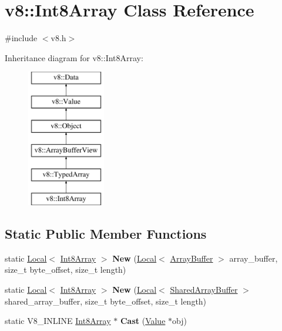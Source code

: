 \hypertarget{classv8_1_1Int8Array}{}\section{v8\+:\+:Int8\+Array Class Reference}
\label{classv8_1_1Int8Array}


{\ttfamily \#include $<$v8.\+h$>$}

Inheritance diagram for v8\+:\+:Int8\+Array\+:\begin{figure}[H]
\begin{center}
\leavevmode
\includegraphics[height=6.000000cm]{classv8_1_1Int8Array}
\end{center}
\end{figure}
\subsection*{Static Public Member Functions}
\begin{DoxyCompactItemize}
\item 
\mbox{\label{classv8_1_1Int8Array_a13e12d1a556aa2ef92271484a10acd21}} 
static \mbox{\hyperlink{classv8_1_1Local}{Local}}$<$ \mbox{\hyperlink{classv8_1_1Int8Array}{Int8\+Array}} $>$ {\bfseries New} (\mbox{\hyperlink{classv8_1_1Local}{Local}}$<$ \mbox{\hyperlink{classv8_1_1ArrayBuffer}{Array\+Buffer}} $>$ array\+\_\+buffer, size\+\_\+t byte\+\_\+offset, size\+\_\+t length)
\item 
\mbox{\label{classv8_1_1Int8Array_a364d52f1dc634e637321b2a9f9ec4dd8}} 
static \mbox{\hyperlink{classv8_1_1Local}{Local}}$<$ \mbox{\hyperlink{classv8_1_1Int8Array}{Int8\+Array}} $>$ {\bfseries New} (\mbox{\hyperlink{classv8_1_1Local}{Local}}$<$ \mbox{\hyperlink{classv8_1_1SharedArrayBuffer}{Shared\+Array\+Buffer}} $>$ shared\+\_\+array\+\_\+buffer, size\+\_\+t byte\+\_\+offset, size\+\_\+t length)
\item 
\mbox{\label{classv8_1_1Int8Array_a201a6b46e2cc455830d62c57bc8b4a3e}} 
static V8\+\_\+\+I\+N\+L\+I\+NE \mbox{\hyperlink{classv8_1_1Int8Array}{Int8\+Array}} $\ast$ {\bfseries Cast} (\mbox{\hyperlink{classv8_1_1Value}{Value}} $\ast$obj)
\end{DoxyCompactItemize}
